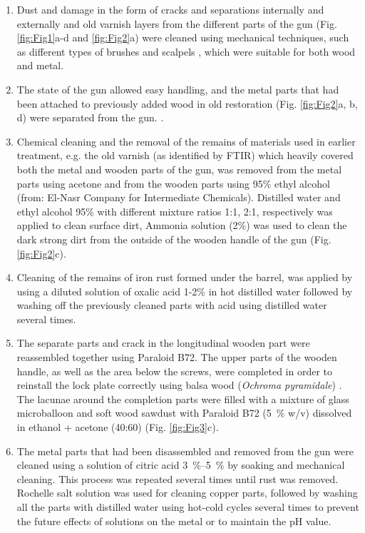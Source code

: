 \begin{enumerate}
	\item Dust and damage in the form of cracks and separations internally and externally and old varnish layers from the different parts of the gun (Fig. \ref{fig:Fig1}a-d and \ref{fig:Fig2}a) were cleaned using mechanical techniques, such as different types of brushes and scalpels \parencite[143]{Unger_2001}, which were suitable for both wood and metal.
	\item The state of the gun allowed easy handling, and the metal parts that had been attached to previously added wood in old restoration (Fig. \ref{fig:Fig2}a, b, d) were separated from the gun.  \parencites[1--2]{Davis_1998}[1--15]{Zelinka_2005}.
	\item Chemical cleaning and the removal of the remains of materials used in earlier treatment, e.g. the old varnish (as identified by FTIR) which heavily covered both the metal and wooden parts of the gun, was removed from the metal parts using acetone and from the wooden parts using 95\% ethyl alcohol (from: El-Nasr Company for Intermediate Chemicals). Distilled water and ethyl alcohol 95\% with different mixture ratios 1:1, 2:1, respectively was applied to clean surface dirt, Ammonia solution (2\%) was used to clean the dark strong dirt from the outside of the wooden handle of the gun (Fig. \ref{fig:Fig2}c). 
	\item Cleaning of the remains of iron rust formed under the barrel, was applied by using a diluted solution of oxalic acid 1-2\% in hot distilled water \parencites[5]{William_1999}[1--20]{Williams_2002} followed by washing off the previously cleaned parts with acid using distilled water several times.
	\item The separate parts and crack in the longitudinal wooden part were reassembled together using Paraloid B72. The upper parts of the wooden handle, as well as the area below the screws, were completed in order to reinstall the lock plate correctly using balsa wood (\textit{Ochroma pyramidale}) \parencite[4--11]{Newman_2013}. The lacunae around the completion parts were filled with a mixture of glass microballoon and soft wood sawdust with Paraloid B72 (\SI{5}{\percent} w/v) dissolved in ethanol + acetone (40:60) (Fig. \ref{fig:Fig3}c).
	\item The metal parts that had been disassembled and removed from the gun were cleaned using a solution of citric acid \SIrange[range-phrase=--]{3}{5}{\percent} by soaking and mechanical cleaning. 
	This process was repeated several times until rust was removed. Rochelle salt solution was used for cleaning copper parts, followed by washing all the parts with distilled water using hot-cold cycles several times to prevent the future effects of solutions on the metal or to maintain the pH value. 

\end{enumerate}
